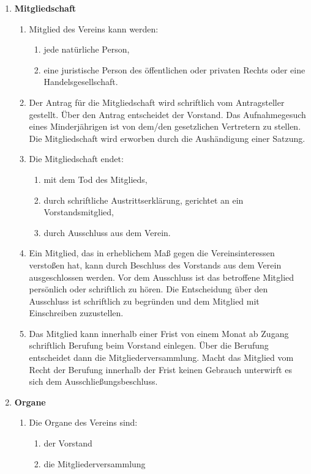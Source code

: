 \documentclass{article}
\begin{document}
\begin{enumerate}[§ 1.]
\item \textsf{\textbf{Mitgliedschaft}}
\begin{enumerate}
\item Mitglied des Vereins kann werden:
\begin{enumerate}
\item jede natürliche Person,
\item eine juristische Person des öffentlichen oder privaten Rechts oder eine Handelsgesellschaft.
\end{enumerate}
\item Der Antrag für die Mitgliedschaft wird schriftlich vom Antragsteller gestellt. Über den Antrag entscheidet der Vorstand. Das Aufnahmegesuch eines Minderjährigen ist von dem/den gesetzlichen Vertretern zu stellen. Die Mitgliedschaft wird erworben durch die Aushändigung einer Satzung.
\item Die Mitgliedschaft endet:
\begin{enumerate}
\item mit dem Tod des Mitglieds,
\item durch schriftliche Austrittserklärung, gerichtet an ein Vorstandsmitglied,
\item durch Ausschluss aus dem Verein.
\end{enumerate}
\item Ein Mitglied, das in erheblichem Maß gegen die Vereinsinteressen verstoßen hat, kann durch Beschluss des Vorstands aus dem Verein ausgeschlossen werden. Vor dem Ausschluss ist das betroffene Mitglied persönlich oder schriftlich zu hören. Die Entscheidung über den Ausschluss ist schriftlich zu begründen und dem Mitglied mit Einschreiben zuzustellen.
\item Das Mitglied kann innerhalb einer Frist von einem Monat ab Zugang schriftlich Berufung beim Vorstand einlegen. Über die Berufung entscheidet dann die
Mitgliederversammlung.
Macht das Mitglied vom Recht der Berufung innerhalb der Frist keinen Gebrauch
unterwirft es sich dem Ausschließungsbeschluss.
\end{enumerate}

\item \textsf{\textbf{Organe}}
\begin{enumerate}
\item Die Organe des Vereins sind:
\begin{enumerate}
\item der Vorstand
\item die Mitgliederversammlung
\end{enumerate}
\end{enumerate}


\end{enumerate}
\end{document}
